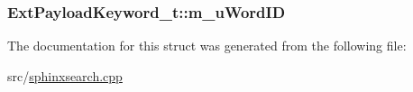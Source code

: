 \hypertarget{structExtPayloadKeyword__t_a8531da61021a38953c7b5f92460fdac8}{
\subsubsection[{m\-\_\-u\-Word\-I\-D}]{ Ext\-Payload\-Keyword\-\_\-t\-::m\-\_\-u\-Word\-I\-D}}\label{structExtPayloadKeyword__t_a8531da61021a38953c7b5f92460fdac8}


The documentation for this struct was generated from the following file\-:\begin{DoxyCompactItemize}
\item 
src/\hyperlink{sphinxsearch_8cpp}{sphinxsearch.\-cpp}\end{DoxyCompactItemize}

